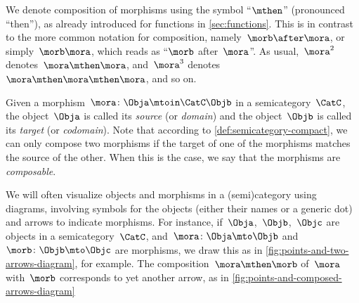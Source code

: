 \begin{remark}
	We denote composition of morphisms using the symbol ``$\mthen$'' (pronounced ``then''), as already introduced for functions in \cref{sec:functions}.
	This is in contrast to the more common notation for composition, namely~$\morb\after \mora$, or simply~$\morb \mora$, which reads as ``$\morb$ after~$\mora$''.
	As usual,~$\mora^2$ denotes~$\mora \mthen \mora$, and~$\mora^3$ denotes~$\mora \mthen \mora \mthen \mora$, and so on.
\end{remark}


Given a morphism~$\mora \colon \Obja \mtoin\CatC \Objb$ in a semicategory~$\CatC$, the object~$\Obja$ is called its \emph{source} (or \emph{domain}) and the object~$\Objb$ is called its \emph{target} (or \emph{codomain}).
Note that according to \cref{def:semicategory-compact}, we can only compose two morphisms if the target of one of the morphisms matches the source of the other.
When this is the case, we say that the morphisms are \emph{composable}.


\begin{marginfigure}
	\begin{center}
	\end{center}
	\caption{}
	\label{fig:points-and-two-arrows-diagram}
\end{marginfigure}

\begin{marginfigure}
	\begin{center}
	\end{center}
	\caption{}
	\label{fig:points-and-composed-arrows-diagram}
\end{marginfigure}

We will often visualize objects and morphisms in a (semi)category using diagrams, involving symbols for the objects (either their names or a generic dot) and arrows to indicate morphisms.
For instance, if~$\Obja$,~$\Objb$,~$\Objc$ are objects in a semicategory~$\CatC$, and~$\mora\colon \Obja \mto \Objb$ and~$\morb\colon \Objb \mto \Objc$ are morphisms, we draw this as in \cref{fig:points-and-two-arrows-diagram}, for example.
The composition~$\mora \mthen \morb$ of~$\mora$ with~$\morb$ corresponds to yet another arrow, as in \cref{fig:points-and-composed-arrows-diagram}

